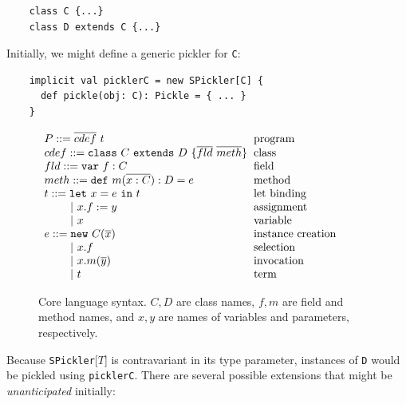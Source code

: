 \documentclass[preprint,10pt]{sigplanconf}
\theoremstyle{definition}
\theoremstyle{definition}
\newcommand{\term}[1]{\mbox{\texttt{#1}}}
\newcommand{\gap}{\quad\quad}
\newcommand{\ba}{\begin{array}}
\newcommand{\ea}{\end{array}}
\newcommand{\seq}[1]{\overline{#1}}
\begin{document}
\begin{lstlisting}
    class C {...}
    class D extends C {...}
\end{lstlisting}

Initially, we might define a generic pickler for \term{C}:

\begin{lstlisting}
    implicit val picklerC = new SPickler[C] {
      def pickle(obj: C): Pickle = { ... }
    }
\end{lstlisting}

\begin{figure}
  \centering
$\ba[t]{l@{\hspace{2mm}}l}
P    ::=  \seq{cdef}~t                           & \mbox{program}             \\
cdef ::=  \texttt{class}~C~\texttt{extends}~D~\{\seq{fld}~\seq{meth}\} & \mbox{class} \\
fld  ::=  \texttt{var}~f: C                      & \mbox{field}               \\
meth ::=  \texttt{def}~m(\seq{x: C}): D = e      & \mbox{method}              \\
t    ::=  \texttt{let}~x = e~\texttt{in}~t       & \mbox{let binding}         \\
\gap ~|~ x.f := y                                & \mbox{assignment}          \\
\gap ~|~ x                                       & \mbox{variable}            \\
e    ::=  \texttt{new}~C(\seq{x})                & \mbox{instance creation}   \\
\gap ~|~ x.f                                     & \mbox{selection}           \\
\gap ~|~ x.m(\seq{y})                            & \mbox{invocation}          \\
\gap ~|~ t                                       & \mbox{term}                \\
\ea$
  \caption{Core language syntax. $C,D$ are class names, $f,m$ are ﬁeld and
    method names, and $x,y$ are names of variables and parameters, respectively.}
  \label{fig:lang-syntax}
\end{figure}



Because \term{SPickler}[$T$] is contravariant in its type parameter, instances
of \term{D} would be pickled using \term{picklerC}. There are several possible
extensions that might be {\em unanticipated} initially:
\end{document}
